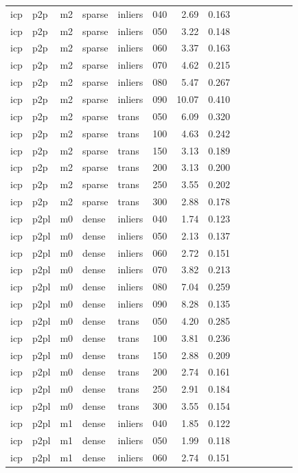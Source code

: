\begin{table}[htbp]
\begin{tabular}{llllllrrrrrrrr}
  icp & p2p & m2 & sparse & inliers & 040 & 2.69 & 0.163 \\
  icp & p2p & m2 & sparse & inliers & 050 & 3.22 & 0.148 \\
  icp & p2p & m2 & sparse & inliers & 060 & 3.37 & 0.163 \\
  icp & p2p & m2 & sparse & inliers & 070 & 4.62 & 0.215 \\
  icp & p2p & m2 & sparse & inliers & 080 & 5.47 & 0.267 \\
  icp & p2p & m2 & sparse & inliers & 090 & 10.07 & 0.410 \\
  icp & p2p & m2 & sparse & trans & 050 & 6.09 & 0.320 \\
  icp & p2p & m2 & sparse & trans & 100 & 4.63 & 0.242 \\
  icp & p2p & m2 & sparse & trans & 150 & 3.13 & 0.189 \\
  icp & p2p & m2 & sparse & trans & 200 & 3.13 & 0.200 \\
  icp & p2p & m2 & sparse & trans & 250 & 3.55 & 0.202 \\
  icp & p2p & m2 & sparse & trans & 300 & 2.88 & 0.178 \\
  icp & p2pl & m0 & dense & inliers & 040 & 1.74 & 0.123 \\
  icp & p2pl & m0 & dense & inliers & 050 & 2.13 & 0.137 \\
  icp & p2pl & m0 & dense & inliers & 060 & 2.72 & 0.151 \\
  icp & p2pl & m0 & dense & inliers & 070 & 3.82 & 0.213 \\
  icp & p2pl & m0 & dense & inliers & 080 & 7.04 & 0.259 \\
  icp & p2pl & m0 & dense & inliers & 090 & 8.28 & 0.135 \\
  icp & p2pl & m0 & dense & trans & 050 & 4.20 & 0.285 \\
  icp & p2pl & m0 & dense & trans & 100 & 3.81 & 0.236 \\
  icp & p2pl & m0 & dense & trans & 150 & 2.88 & 0.209 \\
  icp & p2pl & m0 & dense & trans & 200 & 2.74 & 0.161 \\
  icp & p2pl & m0 & dense & trans & 250 & 2.91 & 0.184 \\
  icp & p2pl & m0 & dense & trans & 300 & 3.55 & 0.154 \\
  icp & p2pl & m1 & dense & inliers & 040 & 1.85 & 0.122 \\
  icp & p2pl & m1 & dense & inliers & 050 & 1.99 & 0.118 \\
  icp & p2pl & m1 & dense & inliers & 060 & 2.74 & 0.151 \\

\end{tabular}
\end{table}
